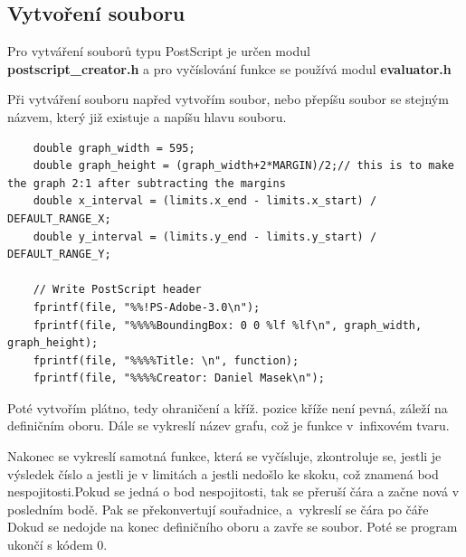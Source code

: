 \documentclass[../main.tex]{subfiles}
\begin{document}
\subsection{Vytvoření souboru}
\hfill Pro vytváření souborů typu PostScript je určen modul \\\textbf{postscript\_creator.h} a pro vyčíslování funkce se používá modul \textbf{evaluator.h}
\vspace{0.5em}

Při vytváření souboru napřed vytvořím soubor, nebo přepíšu soubor se stejným názvem, který již existuje a napíšu hlavu souboru.
\begin{lstlisting}
    double graph_width = 595;
    double graph_height = (graph_width+2*MARGIN)/2;// this is to make the graph 2:1 after subtracting the margins
    double x_interval = (limits.x_end - limits.x_start) / DEFAULT_RANGE_X;
    double y_interval = (limits.y_end - limits.y_start) / DEFAULT_RANGE_Y;

    // Write PostScript header
    fprintf(file, "%%!PS-Adobe-3.0\n");
    fprintf(file, "%%%%BoundingBox: 0 0 %lf %lf\n", graph_width, graph_height);
    fprintf(file, "%%%%Title: \n", function);
    fprintf(file, "%%%%Creator: Daniel Masek\n");
\end{lstlisting}
\vspace{0.5em}


Poté vytvořím plátno, tedy ohraničení a kříž. pozice kříže není pevná, záleží na definičním oboru. Dále se vykreslí název grafu, což je funkce v~infixovém tvaru.
\vspace{0.5em}

Nakonec se vykreslí samotná funkce, která se vyčísluje, zkontroluje se, jestli je výsledek číslo a jestli je v limitách a jestli nedošlo ke skoku, což znamená bod nespojitosti.Pokud se jedná o bod nespojitosti, tak se přeruší čára a začne nová v posledním bodě. Pak se překonvertují souřadnice, a~vykreslí se čára po čáře Dokud se nedojde na konec definičního oboru a zavře se soubor. Poté se program ukončí s kódem 0.
\end{document}
